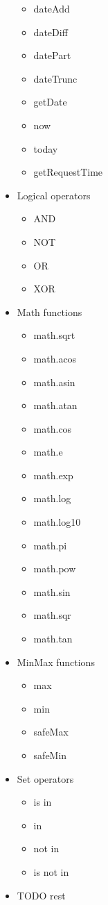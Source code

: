 \begin{itemize}
\begin{itemize}
    \item dateAdd 
    \item dateDiff 
    \item datePart 
    \item dateTrunc 
    \item getDate 
    \item now 
    \item today 
    \item getRequestTime 
    \end{itemize}
    \item Logical operators
    \begin{itemize}
       
\item AND 
\item NOT 
\item OR 
\item XOR 
    \end{itemize}
    \item Math functions
    \begin{itemize}
  
\item math.sqrt 
\item math.acos 
\item math.asin 
\item math.atan 
\item math.cos 
\item math.e 
\item math.exp 
\item math.log 
\item math.log10 
\item math.pi 
\item math.pow 
\item math.sin 
\item math.sqr 
\item math.tan 
    \end{itemize}
    \item MinMax functions
    \begin{itemize}

        \item max 
        \item min 
        \item safeMax 
        \item safeMin 
    \end{itemize}
    \item Set operators
    \begin{itemize}
        \item is in 
        \item in 
        \item not in 
        \item is not in 
    \end{itemize}

    \item TODO rest
\end{itemize}


